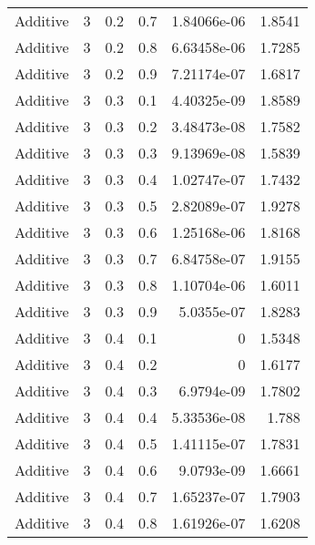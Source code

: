 \documentclass{article}
\begin{document}
\begin{longtable}[H]{lrrrrr}
 Additive       &       3 &   0.2 &            0.7 &      1.84066e-06 &          1.8541 \\
 Additive       &       3 &   0.2 &            0.8 &      6.63458e-06 &          1.7285 \\
 Additive       &       3 &   0.2 &            0.9 &      7.21174e-07 &          1.6817 \\
 Additive       &       3 &   0.3 &            0.1 &      4.40325e-09 &          1.8589 \\
 Additive       &       3 &   0.3 &            0.2 &      3.48473e-08 &          1.7582 \\
 Additive       &       3 &   0.3 &            0.3 &      9.13969e-08 &          1.5839 \\
 Additive       &       3 &   0.3 &            0.4 &      1.02747e-07 &          1.7432 \\
 Additive       &       3 &   0.3 &            0.5 &      2.82089e-07 &          1.9278 \\
 Additive       &       3 &   0.3 &            0.6 &      1.25168e-06 &          1.8168 \\
 Additive       &       3 &   0.3 &            0.7 &      6.84758e-07 &          1.9155 \\
 Additive       &       3 &   0.3 &            0.8 &      1.10704e-06 &          1.6011 \\
 Additive       &       3 &   0.3 &            0.9 &      5.0355e-07  &          1.8283 \\
 Additive       &       3 &   0.4 &            0.1 &      0           &          1.5348 \\
 Additive       &       3 &   0.4 &            0.2 &      0           &          1.6177 \\
 Additive       &       3 &   0.4 &            0.3 &      6.9794e-09  &          1.7802 \\
 Additive       &       3 &   0.4 &            0.4 &      5.33536e-08 &          1.788  \\
 Additive       &       3 &   0.4 &            0.5 &      1.41115e-07 &          1.7831 \\
 Additive       &       3 &   0.4 &            0.6 &      9.0793e-09  &          1.6661 \\
 Additive       &       3 &   0.4 &            0.7 &      1.65237e-07 &          1.7903 \\
 Additive       &       3 &   0.4 &            0.8 &      1.61926e-07 &          1.6208 \\

\end{longtable}
\end{document}
